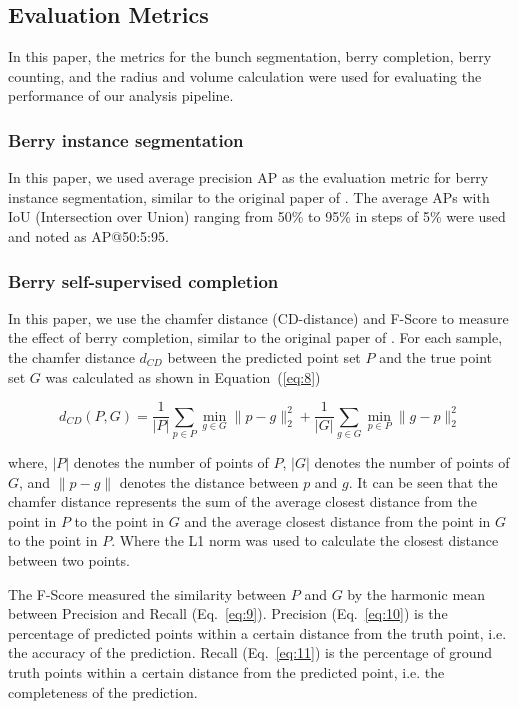 \documentclass[12pt]{article}
\begin{document}
\subsection{Evaluation Metrics}

In this paper, the metrics for the bunch segmentation, berry completion, berry counting, and the radius and volume calculation were used for evaluating the performance of our analysis pipeline.

\subsubsection{Berry instance segmentation}
\label{sec:251}
In this paper, we used average precision AP as the evaluation metric for berry instance segmentation, similar to the original paper of \citet{vu_softgroup_2022}. The average APs with IoU (Intersection over Union) ranging from 50\% to 95\% in steps of 5\% were used and noted as AP@50:5:95.

\subsubsection{Berry self-supervised completion}

In this paper, we use the chamfer distance (CD-distance) and F-Score to measure the effect of berry completion,  similar to the original paper of \citet{yu_pointr_2021}. 
For each sample, the chamfer distance $d_{CD}$ between the predicted point set $P$ and the true point set $G$ was calculated as shown in Equation~(\ref{eq:8})

\begin{equation}
    d_{CD}(P, G) = \frac{1}{|P|} \sum_{p \in P} \min_{g \in G} \|p - g\|_2^2 + \frac{1}{|G|} \sum_{g \in G} \min_{p \in P} \|g - p\|_2^2
    \label{eq:8}
\end{equation}

{\raggedright where, $|P|$ denotes the number of points of $P$, $|G|$ denotes the number of points of $G$, and $\|p - g\|$ denotes the distance between $p$ and $g$. 
It can be seen that the chamfer distance represents the sum of the average closest distance from the point in $P$ to the point in $G$ and the average closest distance from the point in $G$ to the point in $P$. Where the L1 norm was used to calculate the closest distance between two points.}

The F-Score measured the similarity between $P$ and $G$ by the harmonic mean between Precision and Recall (Eq.~\ref{eq:9}). 
Precision (Eq.~\ref{eq:10}) is the percentage of predicted points within a certain distance from the truth point, i.e. the accuracy of the prediction. Recall (Eq.~\ref{eq:11}) is the percentage of ground truth points within a certain distance from the predicted point, i.e. the completeness of the prediction. 
\end{document}
